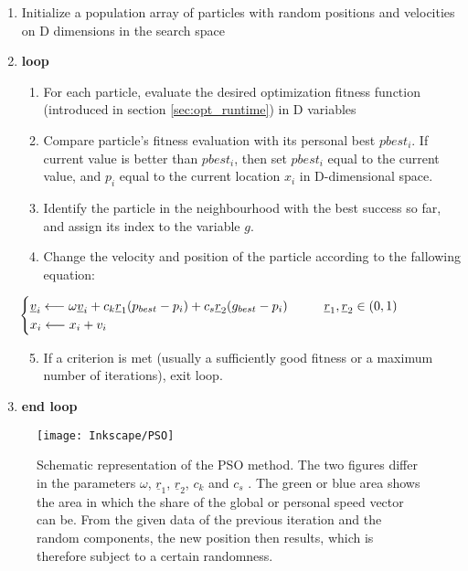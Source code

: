 \begin{enumerate}
\item Initialize a population array of particles with random positions and velocities on D dimensions in the search space
\item \textbf{loop}

\begin{enumerate}

\item  For each particle, evaluate the desired optimization fitness function (introduced in section \ref{sec:opt_runtime}) in D variables
\item  Compare particle's fitness evaluation with its personal best $pbest_i$. If current value is better than \textit{$pbest_i$}, then set $pbest_i$ equal to the current value, and $p_i$ equal to the current location $x_i$ in D-dimensional space.
\item Identify the particle in the neighbourhood with the best success so far, and assign its index to the variable $g$.
\item Change the velocity and position of the particle according to the fallowing equation:

 \begin{equation}
 \hspace{-2cm}
		\begin{cases} \underline{v}_{i} \longleftarrow \omega \underline{v}_i +c_k \underline{r}_1 (p_{best} -p_i)+c_s \underline{r}_2(g_{best}-p_i) \hspace{1cm} \underline{r}_1,\underline{r}_2 \in (0,1) \\
		 x_{i} \longleftarrow x_i +v_{i} \end{cases}
	\label{eq:pso_pseudo}
\end{equation}

\item If a criterion is met (usually a sufficiently good fitness or a maximum number of iterations), exit loop.

\end{enumerate}

\item \textbf{end loop}
\end{enumerate}

\begin{figure}[!htb]
    \centering
    \texttt{[image: Inkscape/PSO]} %
    \caption[Scheme of particle swarm optimization]{Schematic representation of the PSO method. The two figures differ in the parameters $\omega$, $\underline{r}_1$, $\underline{r}_2$, $c_k$ and $c_s$ . The green or blue area shows the area in which the share of the global or personal speed vector can be. From the given data of the previous iteration and the random components, the new position then results, which is therefore subject to a certain randomness.}
    \label{fig:flowchart}
\end{figure}

